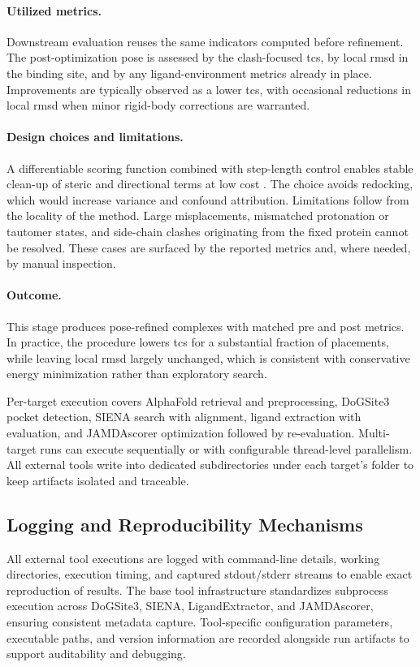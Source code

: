 \paragraph{Utilized metrics.}
Downstream evaluation reuses the same indicators computed before refinement. The post-optimization pose is assessed by the clash-focused \gls{tcs}, by local \gls{rmsd} in the binding site, and by any ligand-environment metrics already in place. Improvements are typically observed as a lower \gls{tcs}, with occasional reductions in local \gls{rmsd} when minor rigid-body corrections are warranted.

\paragraph{Design choices and limitations.}
A differentiable scoring function combined with step-length control enables stable clean-up of steric and directional terms at low cost \cite{flachsenbergConsistentSchemeGradientBased2020b,flachsenbergLSLOptOpensourceImplementation2021}. The choice avoids redocking, which would increase variance and confound attribution. Limitations follow from the locality of the method. Large misplacements, mismatched protonation or tautomer states, and side-chain clashes originating from the fixed protein cannot be resolved. These cases are surfaced by the reported metrics and, where needed, by manual inspection.

\paragraph{Outcome.}
This stage produces pose-refined complexes with matched pre and post metrics. In practice, the procedure lowers \gls{tcs} for a substantial fraction of placements, while leaving local \gls{rmsd} largely unchanged, which is consistent with conservative energy minimization rather than exploratory search.

Per-target execution covers AlphaFold retrieval and preprocessing, DoGSite3 pocket detection, SIENA search with alignment, ligand extraction with evaluation, and JAMDAscorer optimization followed by re-evaluation. Multi-target runs can execute sequentially or with configurable thread-level parallelism. All external tools write into dedicated subdirectories under each target's folder to keep artifacts isolated and traceable.

\subsection{Logging and Reproducibility Mechanisms}
All external tool executions are logged with command-line details, working directories, execution timing, and captured stdout/stderr streams to enable exact reproduction of results. The base tool infrastructure standardizes subprocess execution across DoGSite3, SIENA, LigandExtractor, and JAMDAscorer, ensuring consistent metadata capture. Tool-specific configuration parameters, executable paths, and version information are recorded alongside run artifacts to support auditability and debugging.

